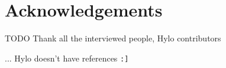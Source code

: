 \documentclass[english]{article}
\begin{document}

\onecolumn

\clearpage
{}





% 





% 



% 



 



\section*{Acknowledgements}
TODO Thank all the interviewed people, Hylo contributors

\newpage

... Hylo doesn't have references \verb|:]|






\end{document}
